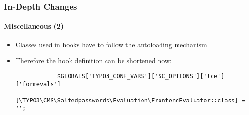\begin{frame}[fragile]
	\frametitle{In-Depth Changes}
	\framesubtitle{Miscellaneous (2)}

	\lstset{basicstyle=\tiny\ttfamily}

	\begin{itemize}

		\item Classes used in hooks have to follow the autoloading mechanism
		\item Therefore the hook definition can be shortened now:

		\begin{lstlisting}
			$GLOBALS['TYPO3_CONF_VARS']['SC_OPTIONS']['tce']['formevals']
			  [\TYPO3\CMS\Saltedpasswords\Evaluation\FrontendEvaluator::class] = '';
		\end{lstlisting}

	\end{itemize}

	\breakingchange

\end{frame}


